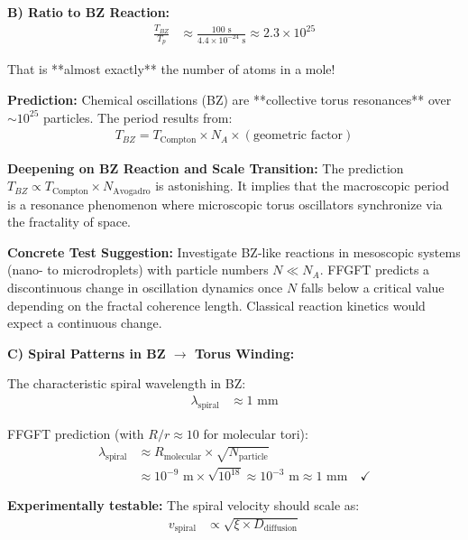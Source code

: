 \documentclass[12pt,a4paper]{article}
\begin{document}
	\textbf{B) Ratio to BZ Reaction:}
	\begin{align*}
		\frac{T_{BZ}}{T_p} &\approx \frac{100 \text{ s}}{4.4 \times 10^{-24} \text{ s}} \approx 2.3 \times 10^{25}
	\end{align*}
	
	That is **almost exactly** the number of atoms in a mole!
	
	\textbf{Prediction:} Chemical oscillations (BZ) are **collective torus resonances** over $\sim 10^{25}$ particles. The period results from:
	\begin{align*}
		T_{BZ} = T_{\text{Compton}} \times N_A \times (\text{geometric factor})
	\end{align*}
	
	\textbf{Deepening on BZ Reaction and Scale Transition:}
	The prediction $T_{BZ} \propto T_{\text{Compton}} \times N_{\text{Avogadro}}$ is astonishing. It implies that the macroscopic period is a resonance phenomenon where microscopic torus oscillators synchronize via the fractality of space.
	
	\textbf{Concrete Test Suggestion:} Investigate BZ-like reactions in mesoscopic systems (nano- to microdroplets) with particle numbers $N \ll N_A$. FFGFT predicts a discontinuous change in oscillation dynamics once $N$ falls below a critical value depending on the fractal coherence length. Classical reaction kinetics would expect a continuous change.
	
	\textbf{C) Spiral Patterns in BZ $\rightarrow$ Torus Winding:}
	
	The characteristic spiral wavelength in BZ:
	\begin{align*}
		\lambda_{\text{spiral}} &\approx 1 \text{ mm}
	\end{align*}
	
	FFGFT prediction (with $R/r \approx 10$ for molecular tori):
	\begin{align*}
		\lambda_{\text{spiral}} &\approx R_{\text{molecular}} \times \sqrt{N_{\text{particle}}} \\
		&\approx 10^{-9} \text{ m} \times \sqrt{10^{18}} \approx 10^{-3} \text{ m} \approx 1 \text{ mm} \quad \checkmark
	\end{align*}
	
	\textbf{Experimentally testable:} The spiral velocity should scale as:
	\begin{align*}
		v_{\text{spiral}} &\propto \sqrt{\xi \times D_{\text{diffusion}}}
	\end{align*}
	
\end{document}
